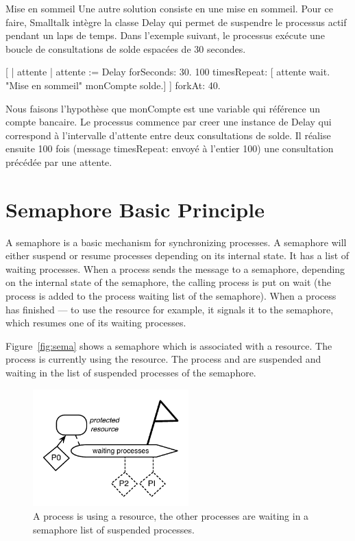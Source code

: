 \documentclass[a4paper,10pt,twoside]{book}
\begin{document}
Mise en sommeil
Une autre solution consiste en une mise en sommeil. Pour ce faire, Smalltalk intègre la classe Delay qui permet de suspendre le processus actif pendant un laps de temps. Dans l'exemple suivant, le processus exécute une boucle de consultations de solde espacées de 30 secondes.

[ | attente |
    attente := Delay forSeconds: 30.
    100 timesRepeat: [
             attente wait.  "Mise en sommeil"
             monCompte solde.]
] forkAt: 40.


Nous faisons l'hypothèse que monCompte est une variable qui référence un compte bancaire. Le processus commence par creer une instance de Delay qui correspond à l'intervalle d'attente entre deux consultations de solde. Il réalise ensuite 100 fois (message timesRepeat: envoyé à l'entier 100) une consultation précédée par une attente.









\section{Semaphore Basic Principle}
A semaphore is a basic mechanism for synchronizing processes.  A semaphore will either suspend or resume processes depending on its internal state. It has a list of waiting processes. 
When a process sends the message  to a semaphore, depending on the internal state of the semaphore, the calling process is put on wait (the process is added to the process waiting list of the semaphore). When a process has finished --- to use the resource for example, it signals it to the semaphore, which resumes one of its waiting processes. 

Figure~\ref{fig:sema} shows a semaphore which is associated with a resource. The process  is currently using the resource. The process  and    are suspended and waiting in the list of suspended processes of the semaphore. 

\begin{figure}
\begin{center}
\includegraphics[width=6cm]{ASemaphoreAndProcesses}
\caption{ A process is using a resource, the other processes are waiting in a semaphore list of suspended processes. }
\end{center}
\end{figure}
\end{document}
